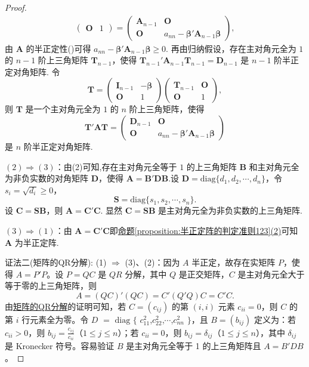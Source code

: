 \documentclass[../../main.tex]{subfiles}%
\begin{document}
\begin{proof}
\begin{align*}
\begin{pmatrix}
\boldsymbol{O} & 1
\end{pmatrix}=
\begin{pmatrix}
\boldsymbol{A}_{n - 1} & \boldsymbol{O} \\
\boldsymbol{O} & a_{nn}-\boldsymbol{\beta}'\boldsymbol{A}_{n - 1}\boldsymbol{\beta}
\end{pmatrix},
\end{align*}
由 $\boldsymbol{A}$ 的半正定性()可得 $a_{nn}-\boldsymbol{\beta}'\boldsymbol{A}_{n - 1}\boldsymbol{\beta}\geqslant 0$. 再由归纳假设，存在主对角元全为 $1$ 的 $n - 1$ 阶上三角矩阵 $\boldsymbol{T}_{n - 1}$，使得 $\boldsymbol{T}_{n - 1}'\boldsymbol{A}_{n - 1}\boldsymbol{T}_{n - 1}=\boldsymbol{D}_{n - 1}$ 是 $n - 1$ 阶半正定对角矩阵. 令
\[
\boldsymbol{T}=\begin{pmatrix}
\boldsymbol{I}_{n - 1} & -\boldsymbol{\beta} \\
\boldsymbol{O} & 1
\end{pmatrix}
\begin{pmatrix}
\boldsymbol{T}_{n - 1} & \boldsymbol{O} \\
\boldsymbol{O} & 1
\end{pmatrix},
\]
则 $\boldsymbol{T}$ 是一个主对角元全为 $1$ 的 $n$ 阶上三角矩阵，使得
\[
\boldsymbol{T}'\boldsymbol{A}\boldsymbol{T}=\begin{pmatrix}
\boldsymbol{D}_{n - 1} & \boldsymbol{O} \\
\boldsymbol{O} & a_{nn}-\boldsymbol{\beta}'\boldsymbol{A}_{n - 1}\boldsymbol{\beta}
\end{pmatrix}
\]
是 $n$ 阶半正定对角矩阵.

$(2)\Rightarrow(3)$：由(2)可知,存在主对角元全等于 $1$ 的上三角矩阵 $\boldsymbol{B}$ 和主对角元全为非负实数的对角矩阵 $\boldsymbol{D}$，使得 $\boldsymbol{A}=\boldsymbol{B}'\boldsymbol{D}\boldsymbol{B}$.设 $\boldsymbol{D}=\mathrm{diag}\{d_1,d_2,\cdots,d_n\}$，令 $s_i = \sqrt{d_i}\geqslant 0$，
\[
\boldsymbol{S}=\mathrm{diag}\{s_1,s_2,\cdots,s_n\}.
\]
设 $\boldsymbol{C}=\boldsymbol{S}\boldsymbol{B}$，则 $\boldsymbol{A}=\boldsymbol{C}'\boldsymbol{C}$. 显然 $\boldsymbol{C}=\boldsymbol{S}\boldsymbol{B}$ 是主对角元全为非负实数的上三角矩阵.

$(3)\Rightarrow(1)$：由 $\boldsymbol{A}=\boldsymbol{C}'\boldsymbol{C}$即\hyperref[proposition:半正定阵的判定准则123]{命题\ref{proposition:半正定阵的判定准则123}(2)}可知 $\boldsymbol{A}$ 为半正定阵.

{\color{blue}证法二(矩阵的QR分解):}
(1) $\Rightarrow$ (3)、(2)：因为 $A$ 半正定，故存在实矩阵 $P$，使得 $A = P'P$。设 $P = QC$ 是 $QR$ 分解，其中 $Q$ 是正交矩阵，$C$ 是主对角元全大于等于零的上三角矩阵，则
\[
A=(QC)'(QC)=C'(Q'Q)C = C'C.
\]
由\hyperref[theorem:矩阵的QR分解]{矩阵的QR分解}的证明可知，若 $C = (c_{ij})$ 的第 $(i,i)$ 元素 $c_{ii}=0$，则 $C$ 的第 $i$ 行元素全为零。令 $D$ $=$ $\mathrm{diag}$ $\{$ $c_{11}^2$,$c_{22}^2$,$\cdots$,$c_{nn}^2$ $\}$，且 $B = (b_{ij})$ 定义为：若 $c_{ii}>0$，则 $b_{ij}=\frac{c_{ij}}{c_{ii}}$（$1\leqslant  j\leqslant  n$）；若 $c_{ii}=0$，则 $b_{ij}=\delta_{ij}$（$1\leqslant  j\leqslant  n$），其中 $\delta_{ij}$ 是 Kronecker 符号。容易验证 $B$ 是主对角元全等于 1 的上三角矩阵且 $A = B'DB$。


\end{proof}
\end{document}
